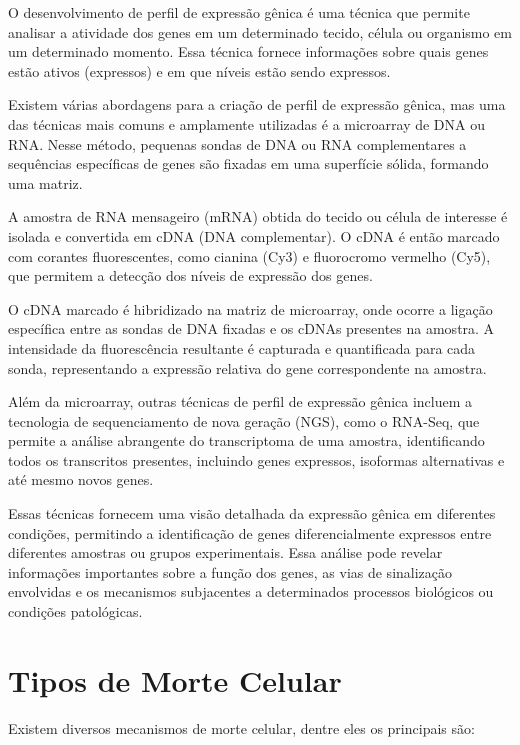 \documentclass[11pt,a4paper]{article}
\begin{document}
	O desenvolvimento de perfil de expressão gênica é uma técnica que permite analisar a atividade dos genes em um determinado tecido, célula ou organismo em um determinado momento. Essa técnica fornece informações sobre quais genes estão ativos (expressos) e em que níveis estão sendo expressos.

	Existem várias abordagens para a criação de perfil de expressão gênica, mas uma das técnicas mais comuns e amplamente utilizadas é a microarray de DNA ou RNA. Nesse método, pequenas sondas de DNA ou RNA complementares a sequências específicas de genes são fixadas em uma superfície sólida, formando uma matriz.
	
	A amostra de RNA mensageiro (mRNA) obtida do tecido ou célula de interesse é isolada e convertida em cDNA (DNA complementar). O cDNA é então marcado com corantes fluorescentes, como cianina (Cy3) e fluorocromo vermelho (Cy5), que permitem a detecção dos níveis de expressão dos genes.
	
	O cDNA marcado é hibridizado na matriz de microarray, onde ocorre a ligação específica entre as sondas de DNA fixadas e os cDNAs presentes na amostra. A intensidade da fluorescência resultante é capturada e quantificada para cada sonda, representando a expressão relativa do gene correspondente na amostra.
	
	Além da microarray, outras técnicas de perfil de expressão gênica incluem a tecnologia de sequenciamento de nova geração (NGS), como o RNA-Seq, que permite a análise abrangente do transcriptoma de uma amostra, identificando todos os transcritos presentes, incluindo genes expressos, isoformas alternativas e até mesmo novos genes.
	
	Essas técnicas fornecem uma visão detalhada da expressão gênica em diferentes condições, permitindo a identificação de genes diferencialmente expressos entre diferentes amostras ou grupos experimentais. Essa análise pode revelar informações importantes sobre a função dos genes, as vias de sinalização envolvidas e os mecanismos subjacentes a determinados processos biológicos ou condições patológicas.
	
\section{Tipos de Morte Celular}

	Existem diversos mecanismos de morte celular, dentre eles os principais são:
\end{document}
